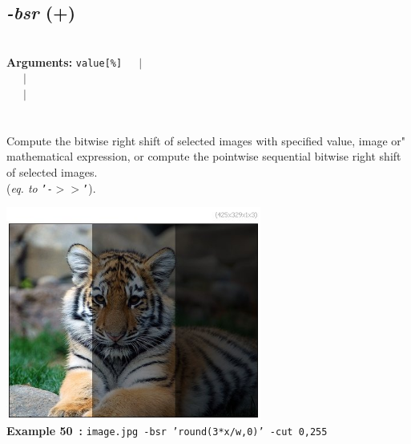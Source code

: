 \documentclass[a4paper,11pt,twoside]{book}
\begin{document}
\subsection{\emph{-bsr} (+)}\vspace*{-0.5em}
~\\\textbf{Arguments: } 
{\small \texttt{value[\%]}}~~~$|$\\
\hspace*{2.2cm}{\small \texttt{[image]}}~~~$|$\\
~~~$|$\\
\\~\\
Compute the bitwise right shift of selected images with specified value, image or"
mathematical expression, or compute the pointwise sequential bitwise right shift of
selected images.
~\\(\emph{eq. to} {\small \texttt{'-$>$$>$'}}).
\begin{center}\includegraphics[keepaspectratio=true,height=7cm,width=\textwidth]{img/gmic_def50.jpg}\\
{\footnotesize \textbf{Example 50~:} \texttt{image.jpg -bsr 'round(3*x/w,0)' -cut 0,255}}
\end{center}
\end{document}
